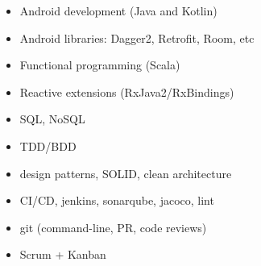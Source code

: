  \begin{multicols}{2}
    \begin{itemize}
	    \item Android development (Java and Kotlin)
	    \item Android libraries: Dagger2, Retrofit, Room, etc
	    \item Functional programming (Scala)
	    \item Reactive extensions (RxJava2/RxBindings) 
	    \item SQL, NoSQL
	    \item TDD/BDD
	    \item design patterns, SOLID, clean architecture
	    \item CI/CD, jenkins, sonarqube, jacoco, lint
	    \item git (command-line, PR, code reviews)
	    \item Scrum + Kanban
    \end{itemize}
 \end{multicols}
